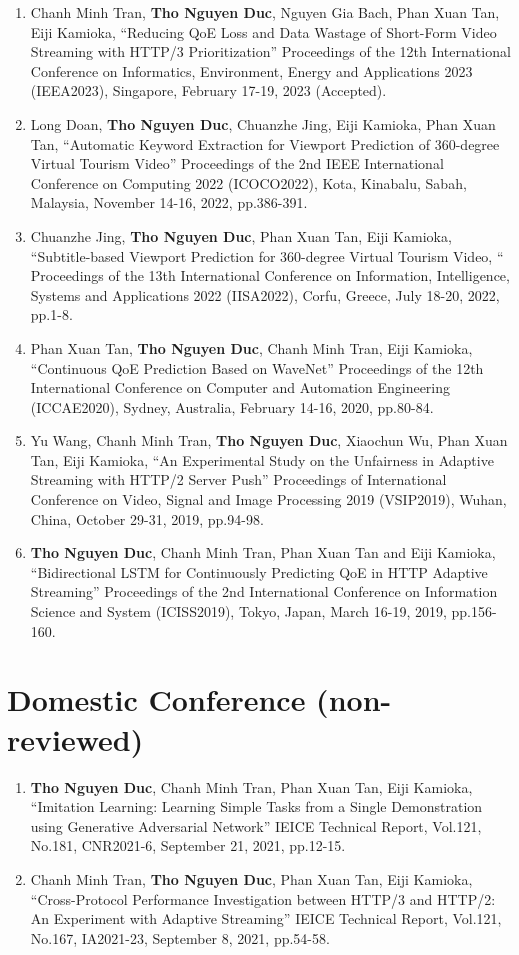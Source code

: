 \begin{enumerate}
  \item Chanh Minh Tran, \textbf{Tho Nguyen Duc}, Nguyen Gia Bach, Phan Xuan Tan, Eiji Kamioka, ``Reducing QoE Loss and Data Wastage of Short-Form Video Streaming with HTTP/3 Prioritization'' Proceedings of the 12th International Conference on Informatics, Environment, Energy and Applications 2023 (IEEA2023), Singapore, February 17-19, 2023 (Accepted).
  \item Long Doan, \textbf{Tho Nguyen Duc}, Chuanzhe Jing, Eiji Kamioka, Phan Xuan Tan, ``Automatic Keyword Extraction for Viewport Prediction of 360-degree Virtual Tourism Video'' Proceedings of the 2nd IEEE International Conference on Computing 2022 (ICOCO2022), Kota, Kinabalu, Sabah, Malaysia, November 14-16, 2022, pp.386-391.
  \item Chuanzhe Jing, \textbf{Tho Nguyen Duc}, Phan Xuan Tan, Eiji Kamioka, ``Subtitle-based Viewport Prediction for 360-degree Virtual Tourism Video, `` Proceedings of the 13th International Conference on Information, Intelligence, Systems and Applications 2022 (IISA2022), Corfu, Greece, July 18-20, 2022, pp.1-8.
  \item Phan Xuan Tan, \textbf{Tho Nguyen Duc}, Chanh Minh Tran, Eiji Kamioka, ``Continuous QoE Prediction Based on WaveNet'' Proceedings of the 12th International Conference on Computer and Automation Engineering (ICCAE2020), Sydney, Australia, February 14-16, 2020, pp.80-84.
  \item Yu Wang, Chanh Minh Tran, \textbf{Tho Nguyen Duc}, Xiaochun Wu, Phan Xuan Tan, Eiji Kamioka, ``An Experimental Study on the Unfairness in Adaptive Streaming with HTTP/2 Server Push'' Proceedings of International Conference on Video, Signal and Image Processing 2019 (VSIP2019), Wuhan, China, October 29-31, 2019, pp.94-98.
  \item \textbf{Tho Nguyen Duc}, Chanh Minh Tran, Phan Xuan Tan and Eiji Kamioka, ``Bidirectional LSTM for Continuously Predicting QoE in HTTP Adaptive Streaming'' Proceedings of the 2nd International Conference on Information Science and System (ICISS2019), Tokyo, Japan, March 16-19, 2019, pp.156-160.
\end{enumerate}

\section*{Domestic Conference (non-reviewed)}

\begin{enumerate}
  \item \textbf{Tho Nguyen Duc}, Chanh Minh Tran, Phan Xuan Tan, Eiji Kamioka, ``Imitation Learning: Learning Simple Tasks from a Single Demonstration using Generative Adversarial Network'' IEICE Technical Report, Vol.121, No.181, CNR2021-6, September 21, 2021, pp.12-15.
  \item Chanh Minh Tran, \textbf{Tho Nguyen Duc}, Phan Xuan Tan, Eiji Kamioka, ``Cross-Protocol Performance Investigation between HTTP/3 and HTTP/2: An Experiment with Adaptive Streaming'' IEICE Technical Report, Vol.121, No.167, IA2021-23, September 8, 2021, pp.54-58.
\end{enumerate}

